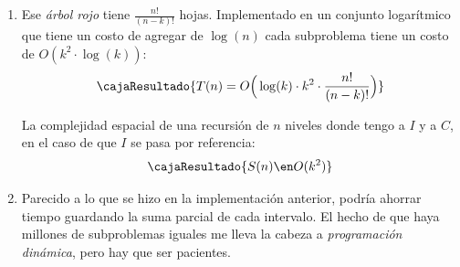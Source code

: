 \begin{enumerate}[label=$\alph*)$]
$$\begin{forest}
            [\set{2,3,4},important=red [\set{1,2,3,4}]],
            ],
            [\set{3,4},important=red
            [\set{1,3,4},important=red [\set{1,2,3,4}]],
            [\set{2,3,4},important=red [\set{1,2,3,4}]],
            ],
            ],
            [\set{3},important=red
            [\set{1,2},important=red ,
            [\set{1,2,3},important=red [\set{1,2,3,4}]],
            [\set{1,2,4},important=red [\set{1,2,3,4}]],
            ],
            [\set{2,3},important=red ,
            [\set{1,2,3},important=red [\set{1,2,3,4}]],
            [\set{2,3,4},important=red [\set{1,2,3,4}]],
            ],
            [\set{3,4},important=red
            [\set{1,3,4},important=red [\set{1,2,3,4}]],
            [\set{2,3,4},important=red [\set{1,2,3,4}]],
            ],
            ],
            [\set{4},important=red
            [\set{1,2},important=red ,
            [\set{1,2,3},important=red [\set{1,2,3,4}]],
            [\set{1,2,4},important=red [\set{1,2,3,4}]],
            ],
            [\set{2,3},important=red ,
            [\set{1,2,3},important=red [\set{1,2,3,4}]],
            [\set{2,3,4},important=red [\set{1,2,3,4}]],
            ],
            [\set{3,4},important=red
            [\set{1,3,4},important=red ,[\set{1,2,3,4}]],
            [\set{2,3,4},important=red ,[\set{1,2,3,4}]],
            ],
            ],
            ]
          \end{forest}
        $$
        Esos conjuntos que se generan seguro van a resolver el problema, pero hay que \textit{analizar la complejidad} como corresponda.

  \item
        Ese \textit{árbol rojo} tiene $\frac{n!}{(n-k)!}$ hojas. Implementado en un conjunto logarítmico que tiene un costo de agregar de $\log(n)$
        cada subproblema tiene un costo de $O(k^2 \cdot \log(k))$:
        $$
          \cajaResultado{
            T(n) = O\Big(
            \log(k) \cdot k^2 \cdot \frac{n!}{(n-k)!}
            \Big)
          }
        $$

        La complejidad espacial de una recursión de $n$ niveles donde tengo a $I$ y a $C$, en el caso de que $I$ se pasa por referencia:
        $$
          \cajaResultado{
            S(n) \en O(k^2)
          }
        $$

  \item Parecido a lo que se hizo en la implementación anterior, podría ahorrar tiempo guardando la suma parcial de cada intervalo.
        El hecho de que haya millones de subproblemas iguales me lleva la cabeza a \textit{programación dinámica}, pero hay que
        ser pacientes.
\end{enumerate}

